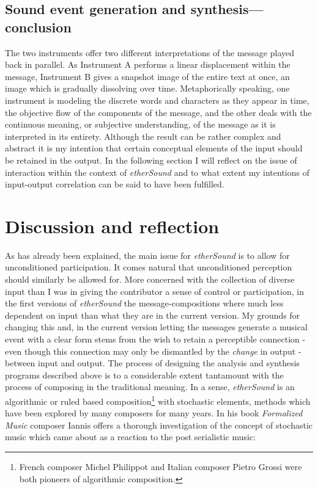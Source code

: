 \subsection{Sound event generation and synthesis---conclusion} The two instruments offer two different interpretations of the message played back in parallel. As Instrument A performs a linear displacement within the message, Instrument B gives a snapshot image of the entire text at once, an image which is gradually dissolving over time. Metaphorically speaking, one instrument is modeling the discrete words and characters as they appear in time, the objective flow of the components of the message, and the other deals with the continuous meaning, or subjective understanding, of the message as it is interpreted in its entirety. Although the result can be rather complex and abstract it is my intention that certain conceptual elements of the input should be retained in the output. In the following section I will reflect on the issue of interaction within the context of \emph{etherSound} and to what extent my intentions of input-output correlation can be said to have been fulfilled. 
\section{Discussion and reflection} As has already been explained, the main issue for \emph{etherSound} is to allow for unconditioned participation. It comes natural that unconditioned perception should similarly be allowed for. More concerned with the collection of diverse input than I was in giving the contributor a sense of control or participation, in the first versions of \emph{etherSound} the message-compositions where much less dependent on input than what they are in the current version. My grounds for changing this and, in the current version letting the messages generate a musical event with a clear form stems from the wish to retain a perceptible connection - even though this connection may only be dismantled by the \emph{change} in output - between input and output. 
The process of designing the analysis and synthesis programs described above is to a considerable extent tantamount with the process of composing in the traditional meaning. In a sense, \emph{etherSound} is an algorithmic or ruled based composition\footnote{French composer   Michel Philippot and Italian composer Pietro Grossi were both   pioneers of algorithmic composition.} with stochastic elements, methods which have been explored by many composers for many years. In his book \textit{Formalized Music} composer Iannis \citet{xenakis71} offers a thorough investigation of the concept of stochastic music which came about as a reaction to the post serialistic music:

